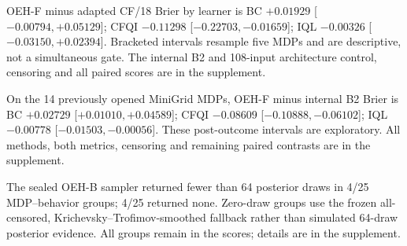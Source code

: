 OEH-F minus adapted CF/18 Brier by learner is BC $+0.01929$ [$-0.00794,+0.05129$]; CFQI $-0.11298$ [$-0.22703,-0.01659$]; IQL $-0.00326$ [$-0.03150,+0.02394$]. Bracketed intervals resample five MDPs and are descriptive, not a simultaneous gate. The internal B2 and 108-input architecture control, censoring and all paired scores are in the supplement.

On the 14 previously opened MiniGrid MDPs, OEH-F minus internal B2 Brier is BC $+0.02729$ [$+0.01010,+0.04589$]; CFQI $-0.08609$ [$-0.10888,-0.06102$]; IQL $-0.00778$ [$-0.01503,-0.00056$]. These post-outcome intervals are exploratory. All methods, both metrics, censoring and remaining paired contrasts are in the supplement.

The sealed OEH-B sampler returned fewer than 64 posterior draws in 4/25 MDP--behavior groups; 4/25 returned none. Zero-draw groups use the frozen all-censored, Krichevsky--Trofimov-smoothed fallback rather than simulated 64-draw posterior evidence. All groups remain in the scores; details are in the supplement.
